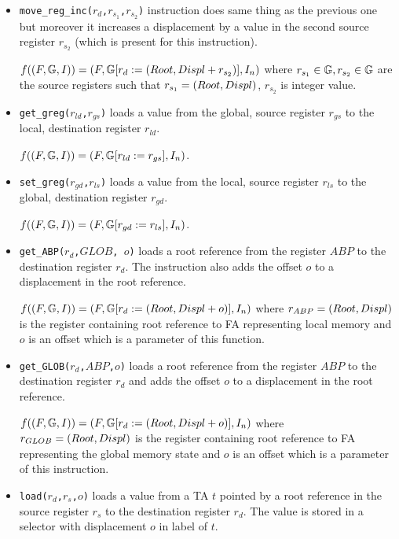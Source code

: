 \begin{itemize}
	\item {\tt move\_reg\_inc($r_d$,$r_{s_1}$,$r_{s_2}$)} instruction does same thing as the previous one but moreover
		it increases a displacement by a value in the second source register $r_{s_2}$ (which is
		present for this instruction).
		
		$f((F, \mathbb{G}, I)) = (F, \mathbb{G} [r_d := (Root,Displ + r_{s_2})], I_n)$
		where $r_{s_1} \in \mathbb{G}, r_{s_2} \in \mathbb{G}$ are the source registers such that
		$r_{s_1}=(Root,Displ)$, $r_{s_2}$ is integer value.
	
	\item {\tt get\_greg($r_{ld}$,$r_{gs}$)} loads a value from the global, source register $r_{gs}$ to
		the local, destination register $r_{ld}$.
		
		$f((F, \mathbb{G}, I)) = (F, \mathbb{G} [r_{ld} := r_{gs}], I_n)$.
	
	\item {\tt set\_greg($r_{gd}$,$r_{ls}$)} loads a value from the local, source register $r_{ls}$ to
		the global, destination register $r_{gd}$.
		
		$f((F, \mathbb{G}, I)) = (F, \mathbb{G} [r_{gd} := r_{ls}], I_n)$.
	
	\item {\tt get\_ABP($r_d$,$GLOB$, $o$)} loads a root reference from the register $ABP$ to
		the destination register $r_d$. The instruction also adds the offset $o$ to a displacement
		in the root reference.

		$f((F, \mathbb{G}, I)) = (F, \mathbb{G} [r_d := 
			(Root,Displ + o)], I_n)$ where $r_{ABP}=(Root,Displ)$ is the register containing root
		reference to FA representing local memory and $o$ is an offset
		which is a parameter of this function.
	
	\item {\tt get\_GLOB($r_d$,$ABP$,$o$)} loads a root reference from the register $ABP$
		to the destination register $r_d$ and adds the offset $o$ to a displacement in the root reference.
		
		$f((F, \mathbb{G}, I)) = (F, \mathbb{G} [r_{d} := 
				(Root,Displ + o)
			], I_n)$ where $r_{GLOB}=(Root,Displ)$ is the register containing root
			reference to FA representing the global memory state and $o$ is an offset
			which is a parameter of this instruction.
	
	\item {\tt load($r_d$,$r_s$,$o$)} loads a value from a TA $t$ pointed
		by a root reference in the source register $r_s$ to the destination register $r_d$.
		The value is stored in a selector with displacement $o$ in label of $t$.
		

\end{itemize}
